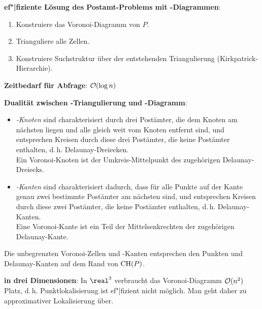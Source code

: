 \textbf{ef"|fiziente Lösung des Postamt-Problems mit -Diagrammen}:
\begin{enumerate}
    \item
    Konstruiere das Voronoi-Diagramm von $P$.
    
    \item
    Trianguliere alle Zellen.
    
    \item
    Konstruiere Suchstruktur über der entstehenden Triangulierung (Kirkpatrick-Hierarchie).
\end{enumerate}

\textbf{Zeitbedarf für Abfrage}:
$\mathcal{O}(\log n)$

\linie

\textbf{Dualität zwischen -Triangulierung und -Diagramm}:
\begin{itemize}
    \item
    \emph{-Knoten}
    sind charakterisiert durch drei Postämter, die dem Knoten am nächsten liegen
    und alle gleich weit vom Knoten entfernt sind,
    und entsprechen Kreisen durch diese drei Postämter, die keine Postämter enthalten,
    d.\,h. Delaunay-Dreiecken.\\
    Ein Voronoi-Knoten ist der Umkreis-Mittelpunkt des zugehörigen Delaunay-Dreiecks.
    
    \item
    \emph{-Kanten}
    sind charakterisiert dadurch, dass für alle Punkte auf der Kante genau zwei bestimmte
    Postämter am nächsten sind,
    und entsprechen Kreisen durch diese zwei Postämter, die keine Postämter enthalten,
    d.\,h. Delaunay-Kanten.\\
    Eine Voronoi-Kante ist ein Teil der Mittelsenkrechten der zugehörigen Delaunay-Kante.
\end{itemize}
Die unbegrenzten Voronoi-Zellen und -Kanten entsprechen den Punkten und Delaunay-Kanten
auf dem Rand von $\operatorname{CH}(P)$.

\linie

\textbf{in drei Dimensionen}:
In $\real^3$ verbraucht das Voronoi-Diagramm $\mathcal{O}(n^2)$ Platz, d.\,h. Punktlokalisierung ist
ef"|fizient nicht möglich.
Man geht daher zu approximativer Lokalisierung über.

\linie

